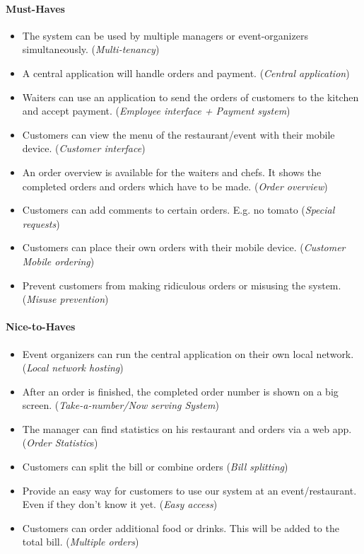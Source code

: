 \documentclass[12pt]{article}
\begin{document}
\paragraph{Must-Haves}
\begin{itemize}
	\item The system can be used by multiple managers or event-organizers simultaneously. 
	(\textit{Multi-tenancy})
	\item A central application will handle orders and payment. 
	(\textit{Central application})
	\item Waiters can use an application to send the orders of customers to the kitchen and accept payment. 
	(\textit{Employee interface + Payment system})
	\item Customers can view the menu of the restaurant/event with their mobile device. 
	(\textit{Customer interface})
	\item An order overview is available for the waiters and chefs. It shows the completed orders and orders which have to be made. 
	(\textit{Order overview})
	\item Customers can add comments to certain orders. E.g. no tomato
	(\textit{Special requests}) 
	\item Customers can place their own orders with their mobile device. 
	(\textit{Customer Mobile ordering})
	\item Prevent customers from making ridiculous orders or misusing the system.
	(\textit{Misuse prevention})
\end{itemize}
\paragraph{Nice-to-Haves}
\begin{itemize}
	\item Event organizers can run the central application on their own local network. 
	(\textit{Local network hosting})
	\item After an order is finished, the completed order number is shown on a big screen. 
	(\textit{Take-a-number/Now serving System})
	\item The manager can find statistics on his restaurant and orders via a web app. 
	(\textit{Order Statistic}s)
	\item Customers can split the bill or combine orders 
	(\textit{Bill splitting})
	\item Provide an easy way for customers to use our system at an event/restaurant. Even if they don’t know it yet. 
	(\textit{Easy access})
	\item Customers can order additional food or drinks. This will be added to the total bill.
	(\textit{Multiple orders})
	
\end{itemize}
\end{document}
